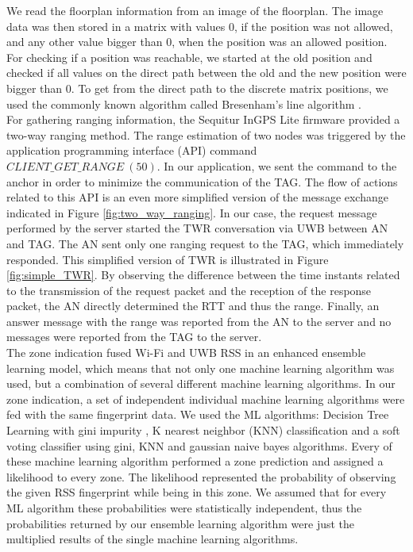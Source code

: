 \noindent\hspace*{5mm}%
We read the floorplan information from an image of the floorplan. The image data was then stored in a matrix with values 0, if the position was not allowed, and any other value bigger than 0, when the position was an allowed position. For checking if a position was reachable, we started at the old position and checked if all values on the direct path between the old and the new position were bigger than 0. To get from the direct path to the discrete matrix positions, we used the commonly known algorithm called Bresenham's line algorithm \cite{bresenham}.\\
\noindent\hspace*{5mm}%
For gathering ranging information, the Sequitur InGPS Lite firmware provided a two-way ranging method. The range estimation of two nodes was triggered by the application programming interface (API) command $CLIENT\_GET\_RANGE\ (50)$. In our application, we sent the command to the anchor in order to minimize the communication of the TAG. The flow of actions related to this API is an even more simplified version of the message exchange indicated in Figure \ref{fig:two_way_ranging}. In our case, the request message performed by the server started the TWR conversation via UWB between AN and TAG. The AN sent only one ranging request to the TAG, which immediately responded. This simplified version of TWR is illustrated in Figure \ref{fig:simple_TWR}. By observing the difference between the time instants related to the transmission of the request packet and the reception of the response packet, the AN directly determined the RTT and thus the range.  Finally, an answer message with the range was reported from the AN to the server and no messages were reported from the TAG to the server.\\
\noindent\hspace*{5mm}%
The zone indication fused Wi-Fi and UWB RSS in an enhanced ensemble learning model, which means that not only one machine learning algorithm was used, but a combination of several different machine learning algorithms. In our zone indication, a set of independent individual machine learning algorithms were fed with the same fingerprint data. We used the ML algorithms: Decision Tree Learning with gini impurity \cite{WikiGini}, K nearest neighbor (KNN) classification \cite{KNN} and a soft voting classifier using gini, KNN and gaussian naive bayes \cite{SKLearn, GaussianNB} algorithms. Every of these machine learning algorithm performed a zone prediction and assigned a likelihood to every zone. The likelihood represented the probability of observing the given RSS fingerprint while being in this zone. We assumed that for every ML algorithm these probabilities were statistically independent, thus the probabilities returned by our ensemble learning algorithm were just the multiplied results of the single machine learning algorithms.\\
